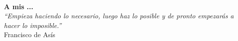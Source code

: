%
%
%
% 
%
%
%
%

\thispagestyle{empty}

\begin{flushright}

  \textbf{} \\
  \vspace{6cm}

  \textbf{A mis ...}\\
  \vspace{3cm}
  \hspace{8cm}
  \emph{``Empieza haciendo lo necesario, luego haz lo posible y de
    pronto empezarás a hacer lo imposible.''}\\ Francisco de Asís

\end{flushright}  


